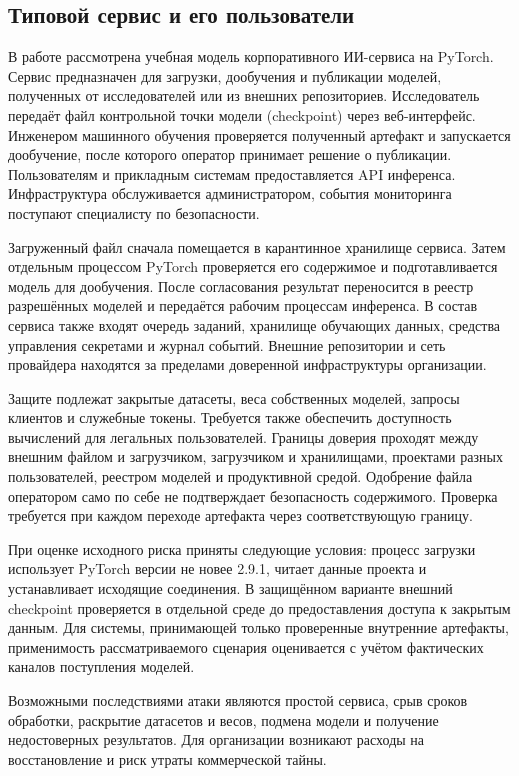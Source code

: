 \documentclass[12pt,a4paper]{report}
\begin{document}
\subsection{Типовой сервис и его пользователи}

В работе рассмотрена учебная модель корпоративного ИИ-сервиса на PyTorch. Сервис предназначен для загрузки, дообучения и публикации моделей, полученных от исследователей или из внешних репозиториев. Исследователь передаёт файл контрольной точки модели (checkpoint) через веб-интерфейс. Инженером машинного обучения проверяется полученный артефакт и запускается дообучение, после которого оператор принимает решение о публикации. Пользователям и прикладным системам предоставляется API инференса. Инфраструктура обслуживается администратором, события мониторинга поступают специалисту по безопасности.

Загруженный файл сначала помещается в карантинное хранилище сервиса. Затем отдельным процессом PyTorch проверяется его содержимое и подготавливается модель для дообучения. После согласования результат переносится в реестр разрешённых моделей и передаётся рабочим процессам инференса. В состав сервиса также входят очередь заданий, хранилище обучающих данных, средства управления секретами и журнал событий. Внешние репозитории и сеть провайдера находятся за пределами доверенной инфраструктуры организации.

Защите подлежат закрытые датасеты, веса собственных моделей, запросы клиентов и служебные токены. Требуется также обеспечить доступность вычислений для легальных пользователей. Границы доверия проходят между внешним файлом и загрузчиком, загрузчиком и хранилищами, проектами разных пользователей, реестром моделей и продуктивной средой. Одобрение файла оператором само по себе не подтверждает безопасность содержимого. Проверка требуется при каждом переходе артефакта через соответствующую границу.

При оценке исходного риска приняты следующие условия: процесс загрузки использует PyTorch версии не новее 2.9.1, читает данные проекта и устанавливает исходящие соединения. В защищённом варианте внешний checkpoint проверяется в отдельной среде до предоставления доступа к закрытым данным. Для системы, принимающей только проверенные внутренние артефакты, применимость рассматриваемого сценария оценивается с учётом фактических каналов поступления моделей.

Возможными последствиями атаки являются простой сервиса, срыв сроков обработки, раскрытие датасетов и весов, подмена модели и получение недостоверных результатов. Для организации возникают расходы на восстановление и риск утраты коммерческой тайны.
\end{document}
